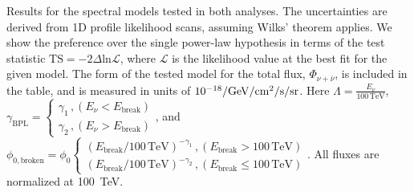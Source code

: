 

\begin{table}[htbp]
\centering
\caption{Results for the spectral models tested in both analyses. The uncertainties are derived from 1D profile likelihood scans, assuming Wilks' theorem applies. We show the preference over the single power-law hypothesis in terms of the test statistic $\mathrm{TS}=-2 \Delta \mathrm{ln} \mathcal{L}$, where $\mathcal{L}$ is the likelihood value at the best fit for the given model. The form of the tested model for the total flux, $\Phi_{\nu+\bar{\nu}}$, is included in the table, and is measured in units of $\rm{10^{-18}/GeV/cm^2/s/sr}$. Here $\Lambda=\frac{E_{\nu}}{100\, \mathrm{TeV}}$,
$\gamma_{\mathrm{BPL}}=\left\{
\begin{array}{c}
       \gamma_1\, , (E_{\nu} < E_{\mathrm{break}})\\
       \gamma_2\, , (E_{\nu} > E_{\mathrm{break}})
\end{array}\right.$,
and $\phi_{0,\mathrm{broken}}=\phi_{0}\left\{
\begin{array}{c}
       \left(E_{\mathrm{break}}/100\,\mathrm{TeV}\right)^{-\gamma_1}\, , (E_{\mathrm{break}} > 100\,\mathrm{TeV})\\
       \left(E_{\mathrm{break}}/100\,\mathrm{TeV}\right)^{-\gamma_2}\, , (E_{\mathrm{break}} \leq 100\,\mathrm{TeV})
\end{array}\right.$.
All fluxes are normalized at \SI{100}{TeV}.
}

\label{tab:results}
\renewcommand{\arraystretch}{1.6}
\setlength\tabcolsep{0.8em}
\small


\end{table}
